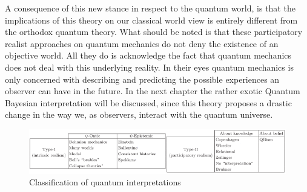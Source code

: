 \documentclass[11pt, a4 paper]{article}
\begin{document}
\begin{multicols}{2}
A consequence of this new stance in respect to the quantum world, is that the implications of this theory on our classical world view is entirely different from the orthodox quantum theory. What should be noted is that these participatory realist approaches on quantum mechanics do not deny the existence of an objective world. All they do is acknowledge the fact that quantum mechanics does not deal with this underlying reality. In their eyes quantum mechanics is only concerned with describing and predicting the possible experiences an observer can have in the future. In the next chapter the rather exotic Quantum Bayesian interpretation will be discussed, since this theory  proposes a drastic change in the way we, as observers, interact with the quantum universe.
\end{multicols}
\begin{figure}[h!]
    \centering
    \includegraphics[scale=0.85]{psi.png}
    \caption{Classification of quantum interpretations\cite{classific}}
    \label{fig:my_label}
\end{figure}
\end{document}
